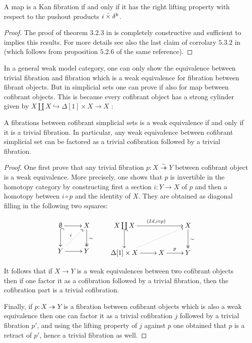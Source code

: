 \documentclass[reqno,10pt,a4paper,oneside,draft]{amsart}
\begin{document}
\begin{proposition} A map is a Kan fibration if and only if it has the right lifting property with respect to the pushout products $i \mathbin{\hat{\times}} \delta^k$.
\end{proposition} 

\begin{proof}The proof of theorem $3.2.3$ in \cite{joyal-tierney:simplicial-homotopy-theory} is completely constructive and sufficient to implies this results.
For more details see also the last claim of corrolary $5.3.2$ in \cite{henry2018wms} (which follows from proposition $5.2.6$ of the same reference). 
\end{proof}

In a general weak model category, one can only show the equivalence between trivial fibration and fibration which is a weak equivalence for fibration between fibrant objects. But in simplicial sets one can prove if also for map between cofibrant objects. This is because every cofibrant object has a strong cylinder given by $X \coprod X \hookrightarrow \Delta[1] \times X \rightarrow X$ :

\begin{lemma}\label{lemma:triv_fib_are_we}
A fibrations between cofibrant simplicial sets is a weak equivalence if and only if it is a trivial fibration.
In particular, any weak equivalence between cofibrant simplicial set can be factored as a trivial cofibration followed by a trivial fibration.
\end{lemma}

\begin{proof}
One first prove that any trivial fibration  $p:X \overset{\sim}{\twoheadrightarrow} Y$ between cofibrant object is a weak equivalence. More precisely, one shows that $p$ is invertible in the homotopy category by constructing first a section $i:Y \rightarrow X$ of $p$ and then a homotopy between $i \circ p$ and the identity of $X$. They are obtained as diagonal filling in the following two squares:

\[
\xymatrix{\emptyset \ar[r] \ar@{^{(}->}[d] & X \ar@{->>}[d]^{\sim} \\ Y \ar@{.>}[ur]^{i} \ar[r] & Y}
\qquad
\xymatrix{X \coprod X \ar[rr]^{(Id, i \circ p)} \ar@{^{(}->}[d] & &  X \ar@{->>}[d]^{\sim} \\ \Delta[1] \times X \ar@{.>}[rru] \ar[r]& X \ar[r]^{p} & Y  }
\]

It follows that if $X \rightarrow Y$ is a weak equivalences between two cofibrant objects then if one factor it as a cofibration followed by a trivial fibration, then the cofibration part is a trivial cofibration. 

Finally, if $p : X \twoheadrightarrow Y$ is a fibration between cofibrant objects which is also a weak equivalence then one can factor it as a trivial cofibration $j$ followed by a trivial fibration $p'$, and using the lifting property of $j$ against $p$ one obtained that $p$ is a retract of $p'$, hence a trivial fibration as well.


\end{proof}
\end{document}
